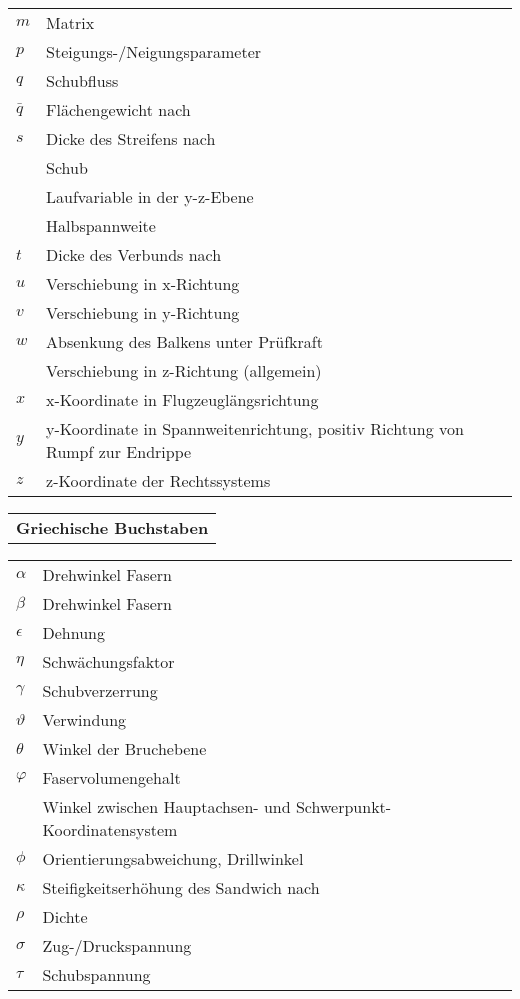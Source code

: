\begin{longtable}[l]{ll}
$m$&Matrix\\
$ p $&Steigungs-/Neigungsparameter\\
$ q $&Schubfluss\\
$ \bar{q} $&Flächengewicht nach \cite{item5}\\
$ s $&Dicke des Streifens nach \cite{item1}\\
&Schub\\
&Laufvariable in der y-z-Ebene\\
&Halbspannweite\\
$ t $&Dicke des Verbunds nach \cite{item3}\\
$u$&Verschiebung in x-Richtung\\
$v$&Verschiebung in y-Richtung\\
$ w $&Absenkung des Balkens unter Prüfkraft\\
&Verschiebung in z-Richtung (allgemein)\\
$ x $&x-Koordinate in Flugzeuglängsrichtung\\
$ y $&y-Koordinate in Spannweitenrichtung, positiv Richtung von Rumpf zur Endrippe\\
$ z $&z-Koordinate der Rechtssystems\\
\end{longtable}
\begin{longtable}[l]{l}
	\textbf{Griechische Buchstaben}\\
\end{longtable}
\begin{longtable}[l]{ll}
\onehalfspacing
$\alpha$&Drehwinkel Fasern\\
$\beta$&Drehwinkel Fasern\\
$ \epsilon $&Dehnung \\
$ \eta $&Schwächungsfaktor\\
$\gamma$&Schubverzerrung\\
$ \vartheta $&Verwindung\\
$ \theta $ &Winkel der Bruchebene\\
$ \varphi $&Faservolumengehalt\\
&Winkel zwischen Hauptachsen- und Schwerpunkt-Koordinatensystem\\
$ \phi $&Orientierungsabweichung, Drillwinkel\\
$ \kappa $&Steifigkeitserhöhung des Sandwich nach \cite{item1}\\
$ \rho $&Dichte\\
$ \sigma $&Zug-/Druckspannung\\
$ \tau $&Schubspannung \\
\end{longtable}
